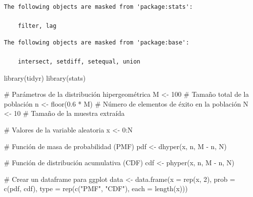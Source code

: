\documentclass[
  letterpaper,
  DIV=11,
  numbers=noendperiod]{scrreprt}
\newenvironment{Shaded}{\begin{snugshade}}{\end{snugshade}}
\newcommand{\AttributeTok}[1]{\textcolor[rgb]{0.40,0.45,0.13}{#1}}
\newcommand{\CommentTok}[1]{\textcolor[rgb]{0.37,0.37,0.37}{#1}}
\newcommand{\DecValTok}[1]{\textcolor[rgb]{0.68,0.00,0.00}{#1}}
\newcommand{\FloatTok}[1]{\textcolor[rgb]{0.68,0.00,0.00}{#1}}
\newcommand{\FunctionTok}[1]{\textcolor[rgb]{0.28,0.35,0.67}{#1}}
\newcommand{\NormalTok}[1]{\textcolor[rgb]{0.00,0.23,0.31}{#1}}
\newcommand{\OtherTok}[1]{\textcolor[rgb]{0.00,0.23,0.31}{#1}}
\newcommand{\SpecialCharTok}[1]{\textcolor[rgb]{0.37,0.37,0.37}{#1}}
\newcommand{\StringTok}[1]{\textcolor[rgb]{0.13,0.47,0.30}{#1}}
\begin{document}
\begin{verbatim}
The following objects are masked from 'package:stats':

    filter, lag
\end{verbatim}

\begin{verbatim}
The following objects are masked from 'package:base':

    intersect, setdiff, setequal, union
\end{verbatim}

\begin{Shaded}
\begin{Highlighting}[]
\FunctionTok{library}\NormalTok{(tidyr)}
\FunctionTok{library}\NormalTok{(stats)}

\CommentTok{\# Parámetros de la distribución hipergeométrica}
\NormalTok{M }\OtherTok{\textless{}{-}} \DecValTok{100}  \CommentTok{\# Tamaño total de la población}
\NormalTok{n }\OtherTok{\textless{}{-}} \FunctionTok{floor}\NormalTok{(}\FloatTok{0.6} \SpecialCharTok{*}\NormalTok{ M)  }\CommentTok{\# Número de elementos de éxito en la población}
\NormalTok{N }\OtherTok{\textless{}{-}} \DecValTok{10}  \CommentTok{\# Tamaño de la muestra extraída}

\CommentTok{\# Valores de la variable aleatoria}
\NormalTok{x }\OtherTok{\textless{}{-}} \DecValTok{0}\SpecialCharTok{:}\NormalTok{N}

\CommentTok{\# Función de masa de probabilidad (PMF)}
\NormalTok{pdf }\OtherTok{\textless{}{-}} \FunctionTok{dhyper}\NormalTok{(x, n, M }\SpecialCharTok{{-}}\NormalTok{ n, N)}

\CommentTok{\# Función de distribución acumulativa (CDF)}
\NormalTok{cdf }\OtherTok{\textless{}{-}} \FunctionTok{phyper}\NormalTok{(x, n, M }\SpecialCharTok{{-}}\NormalTok{ n, N)}

\CommentTok{\# Crear un dataframe para ggplot}
\NormalTok{data }\OtherTok{\textless{}{-}} \FunctionTok{data.frame}\NormalTok{(}\AttributeTok{x =} \FunctionTok{rep}\NormalTok{(x, }\DecValTok{2}\NormalTok{),}
                   \AttributeTok{prob =} \FunctionTok{c}\NormalTok{(pdf, cdf),}
                   \AttributeTok{type =} \FunctionTok{rep}\NormalTok{(}\FunctionTok{c}\NormalTok{(}\StringTok{"PMF"}\NormalTok{, }\StringTok{"CDF"}\NormalTok{), }\AttributeTok{each =} \FunctionTok{length}\NormalTok{(x)))}


\end{Highlighting}
\end{Shaded}
\end{document}
